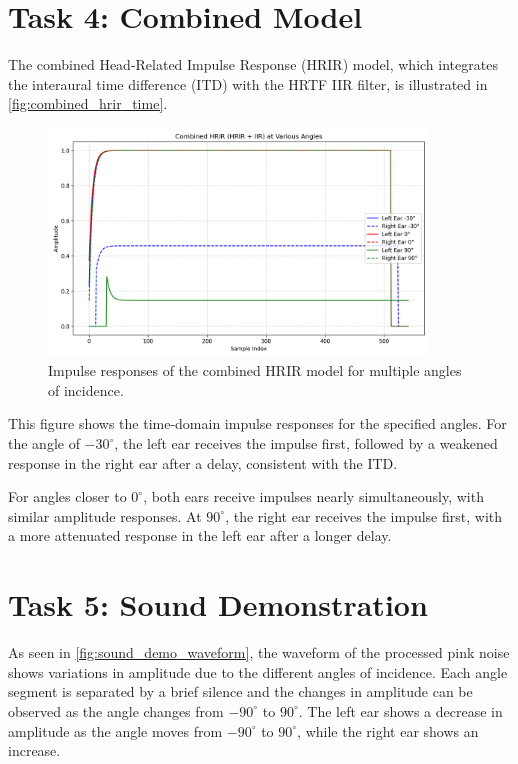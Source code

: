 \section{Task 4: Combined Model}
\label{sec:results_task4}

The combined Head-Related Impulse Response (HRIR) model, which integrates the interaural time difference (ITD) with the HRTF IIR filter, is illustrated in \autoref{fig:combined_hrir_time}.

\begin{figure}[H]
    \centering
    \includegraphics[width=0.9\textwidth]{data/figures/task_4/combined_hrir_time_multiple.png}
    \caption{Impulse responses of the combined HRIR model for multiple angles of incidence.}
    \label{fig:combined_hrir_time}
\end{figure}

This figure shows the time-domain impulse responses for the specified angles. For the angle of \(-30^\circ\), the left ear receives the impulse first, followed by a weakened response in the right ear after a delay, consistent with the ITD.

For angles closer to \(0^\circ\), both ears receive impulses nearly simultaneously, with similar amplitude responses. At \(90^\circ\), the right ear receives the impulse first, with a more attenuated response in the left ear after a longer delay.


\section{Task 5: Sound Demonstration}
\label{sec:results_task5}

As seen in \autoref{fig:sound_demo_waveform}, the waveform of the processed pink noise shows variations in amplitude due to the different angles of incidence. Each angle segment is separated by a brief silence and the changes in amplitude can be observed as the angle changes from \(-90^\circ\) to \(90^\circ\). The left ear shows a decrease in amplitude as the angle moves from \(-90^\circ\) to \(90^\circ\), while the right ear shows an increase.

